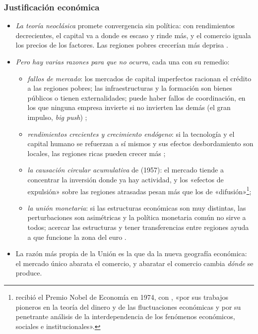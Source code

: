 \documentclass[11pt]{article}
\begin{document}
\subsubsection{Justificación económica}

\begin{itemize}
\item \emph{La teoría neoclásica} promete convergencia sin política: con rendimientos decrecientes, el capital va a donde es escaso y rinde más, y el comercio iguala los precios de los factores. Las regiones pobres crecerían más deprisa .
\item \emph{Pero hay varias razones para que no ocurra}, cada una con su remedio:
  \begin{itemize}
  \item \emph{fallos de mercado}: los mercados de capital imperfectos racionan el crédito a las regiones pobres; las infraestructuras y la formación son bienes públicos o tienen externalidades; puede haber fallos de coordinación, en los que ninguna empresa invierte si no invierten las demás (el gran impulso, \emph{big push}) ;
  \item \emph{rendimientos crecientes y crecimiento endógeno}: si la tecnología y el capital humano se refuerzan a sí mismos y sus efectos desbordamiento son locales, las regiones ricas pueden crecer más ;
  \item \emph{la causación circular acumulativa} de  (1957): el mercado tiende a concentrar la inversión donde ya hay actividad, y los «efectos de expulsión» sobre las regiones atrasadas pesan más que los de «difusión»\footnote{ recibió el Premio Nobel de Economía en 1974, con , «por sus trabajos pioneros en la teoría del dinero y de las fluctuaciones económicas y por su penetrante análisis de la interdependencia de los fenómenos económicos, sociales e institucionales»\nocite{Nobel1974,Myrdal1957}.};
  \item \emph{la unión monetaria}: si las estructuras económicas son muy distintas, las perturbaciones son asimétricas y la política monetaria común no sirve a todos; acercar las estructuras y tener transferencias entre regiones ayuda a que funcione la zona del euro .
  \end{itemize}
\item La razón más propia de la Unión es la que da la nueva geografía económica: el mercado único abarata el comercio, y abaratar el comercio cambia \emph{dónde} se produce.
\end{itemize}
\end{document}
